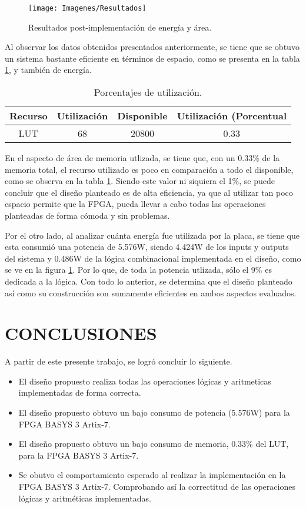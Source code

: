 \documentclass[journal,trans]{IEEEtran}
\begin{document}
\begin{figure}[!h]
	\centering
	\texttt{[image: Imagenes/Resultados]}
	\caption{Resultados post-implementación de energía y área.}
	\label{fig:Resultados}
\end{figure}

Al observar  los datos obtenidos presentados anteriormente, se tiene que se obtuvo un sistema bastante eficiente en términos de espacio, como se presenta en la tabla \ref{tab:porcentajes}, y también de energía.

\begin{table}[!h]
  \begin{center}
    \caption{Porcentajes de utilización.}
    \label{tab:porcentajes}
    \begin{tabular}{c | c | c | c }
      \hline
      Recurso & Utilización & Disponible & Utilización (Porcentual\\
      \hline
       LUT & 68 & 20800 & 0.33 \\
    \end{tabular}
  \end{center}
\end{table}

En el aspecto de área de memoria utlizada, se tiene que, con un 0.33\% de la memoria total, el recurso utilizado es poco en comparación a todo el disponible, como se observa en la tabla \ref{tab:porcentajes}. Siendo este valor ni siquiera el 1\%, se puede concluir que el diseño planteado es de alta eficiencia, ya que al utilizar tan poco espacio permite que la FPGA, pueda llevar a cabo todas las operaciones planteadas de forma cómoda y sin problemas.

Por el otro lado, al analizar cuánta energía fue utilizada por la placa, se tiene que esta consumió una potencia de 5.576W, siendo 4.424W de los inputs y outputs del sistema y 0.486W de la lógica combinacional implementada en el diseño, como se ve en la figura \ref{fig:Resultados}. Por lo que, de toda la potencia utlizada, sólo el 9\% es dedicada a la lógica. Con todo lo anterior, se determina que el diseño planteado así como su construcción son sumamente eficientes en ambos aspectos evaluados.

\section{CONCLUSIONES}
A partir de este presente trabajo, se logró concluir lo siguiente.
\begin{itemize}
    \item El diseño propuesto realiza todas las operaciones lógicas y aritmeticas implementadas de forma correcta.
    \item El diseño propuesto obtuvo un bajo consumo de potencia (5.576W) para la FPGA BASYS 3 Artix-7.
    \item El diseño propuesto obtuvo un bajo consumo de memoria, 0.33\% del LUT, para la FPGA BASYS 3 Artix-7.
    \item Se obutvo el comportamiento esperado al realizar la implementación en la FPGA BASYS 3 Artix-7. Comprobando así la correctitud de las operaciones lógicas y aritméticas implementadas.
\end{itemize}
\end{document}
